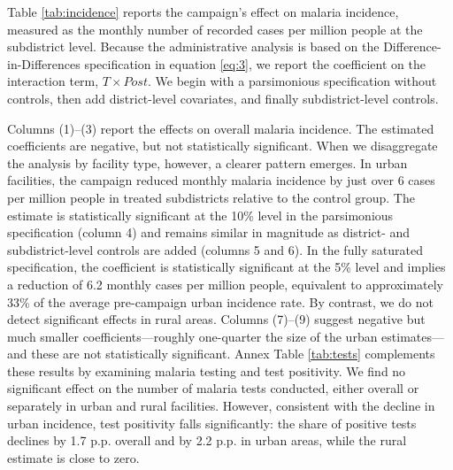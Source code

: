 Table \ref{tab:incidence} reports the campaign’s effect on malaria incidence, measured as the monthly number of recorded cases per million people at the subdistrict level. Because the administrative analysis is based on the Difference-in-Differences specification in equation \ref{eq:3}, we report the coefficient on the interaction term, \(T \times Post\). We begin with a parsimonious specification without controls, then add district-level covariates, and finally subdistrict-level controls.



\begin{table}[h!]
    \centering
    \caption{Malaria monthly incidence rates (N. of monthly cases/1M people)}
    \footnotesize
    
    \label{tab:incidence}
\end{table}

Columns (1)--(3) report the effects on overall malaria incidence. The estimated coefficients are negative, but not statistically significant. When we disaggregate the analysis by facility type, however, a clearer pattern emerges. In urban facilities, the campaign reduced monthly malaria incidence by just over 6 cases per million people in treated subdistricts relative to the control group. The estimate is statistically significant at the 10\% level in the parsimonious specification (column 4) and remains similar in magnitude as district- and subdistrict-level controls are added (columns 5 and 6). In the fully saturated specification, the coefficient is statistically significant at the 5\% level and implies a reduction of 6.2 monthly cases per million people, equivalent to approximately 33\% of the average pre-campaign urban incidence rate. By contrast, we do not detect significant effects in rural areas. Columns (7)--(9) suggest negative but much smaller coefficients---roughly one-quarter the size of the urban estimates---and these are not statistically significant. Annex Table \ref{tab:tests} complements these results by examining malaria testing and test positivity. We find no significant effect on the number of malaria tests conducted, either overall or separately in urban and rural facilities. However, consistent with the decline in urban incidence, test positivity falls significantly: the share of positive tests declines by 1.7 p.p. overall and by 2.2 p.p. in urban areas, while the rural estimate is close to zero.




